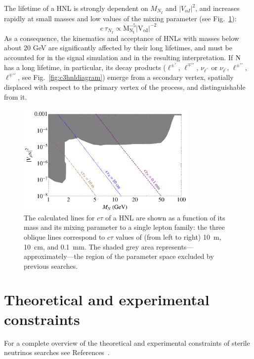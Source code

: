 The lifetime of a HNL is strongly dependent on $M_{N_I}$ and $|V_{\alpha I}|^2$,
and increases rapidly at small masses and low values of the mixing
parameter (see Fig.~\ref{fig:hnlLifetime}):
\begin{equation}
\label{eq:lifetimedependences}
c\:\tau_{N_{I}} \propto\mathrm{M_{N_I}^{-5}|V_{\alpha I}|^{-2}}
\end{equation}
As a consequence, the kinematics and acceptance of HNLs with masses
below about 20 GeV are significantly affected by their long lifetimes,
and must be accounted for in the signal simulation and in the resulting
interpretation.
If $\mathrm{N}$ has a long lifetime, in particular, its decay products
($\ell^{\pm\prime}$, $\ell^{\mp\prime\prime}$, $\nu_{\ell^{\prime\prime}}$ or
$\nu_{\ell^{\prime}}$, $\ell^{\pm\prime\prime}$, $\ell^{\mp\prime\prime}$, see Fig.~\ref{fig:c3hnldiagram})
emerge from a secondary vertex, spatially displaced with respect to
the primary vertex of the process, and distinguishable from it.
\begin{figure}
\centering
\includegraphics[width=0.78\textwidth]{Figures/c3/graph_displ.png}
\caption{The calculated lines for $c\tau$ of a HNL are shown as a function of its mass \mhnl
and its mixing parameter \mixpar to a single lepton family:
the three oblique lines correspond to $c\tau$ values of (from left to
right) 10~m,  10~cm, and 0.1~mm.
The shaded grey area represents---approximately---the region of the
parameter space excluded by previous searches.}
\label{fig:hnlLifetime}
\end{figure}


\section{Theoretical and experimental constraints} \label{sec:currentlimits}
For a complete overview of the theoretical and experimental constraints of sterile neutrinos searches see References~\cite{Deppisch_2015,10.3389/fphy.2018.00040,PhysRevD.78.013010,Drewes_2017,DREWES2017250,Antusch_2014}.


